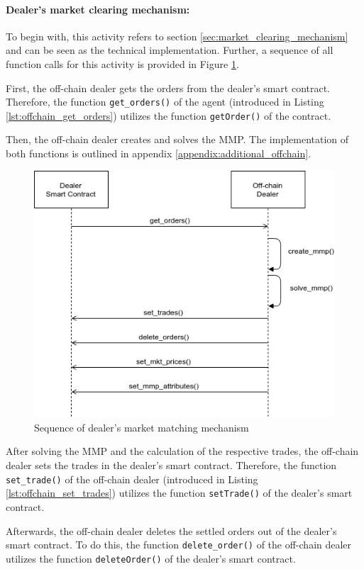 \paragraph{Dealer's market clearing mechanism:}
To begin with, this activity refers to section \ref{sec:market_clearing_mechanism} and can be seen as
the technical implementation. Further, a sequence of all function 
calls for this activity is provided in Figure \ref{figure:dealers_mmp}.

First, the off-chain dealer gets the orders from the dealer's smart contract.
Therefore, the function \verb|get_orders()| of the agent (introduced in Listing \ref{lst:offchain_get_orders})
utilizes the function \verb|getOrder()| of the contract.

Then, the off-chain dealer creates and solves the MMP.
The implementation of both functions is outlined in appendix \ref{appendix:additional_offchain}.

\begin{figure}[htbp]
	\centering
	\includegraphics[width=.8\linewidth]{./figures/dealers_mmp.png}
	\caption{Sequence of dealer's market matching mechanism}
	\label{figure:dealers_mmp}
\end{figure}

After solving the MMP and the calculation of the respective 
trades, the off-chain dealer sets the trades in the dealer's smart contract.
Therefore, the function \verb|set_trade()| of the off-chain dealer (introduced in Listing \ref{lst:offchain_set_trades})
utilizes the function \verb|setTrade()| of the dealer's smart contract.

Afterwards, the off-chain dealer deletes the settled orders out of the dealer's
smart contract. 
To do this, the function \verb|delete_order()| of the off-chain dealer
utilizes the function \verb|deleteOrder()| of the dealer's smart contract.


